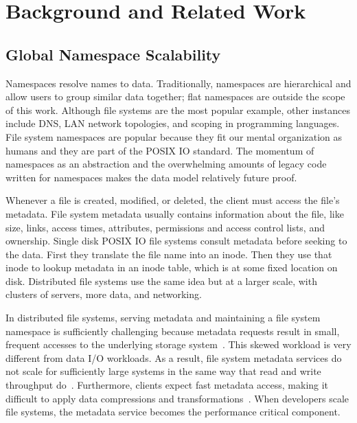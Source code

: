 \chapter{Background and Related Work}
\label{related-work}

\section{Global Namespace Scalability}

Namespaces resolve names to data. Traditionally, namespaces are hierarchical
and allow users to group similar data together; flat namespaces are outside the
scope of this work. Although file systems are the most popular example, other
instances include DNS, LAN network topologies, and scoping in programming
languages.  File system namespaces are popular because they fit our mental
organization as humans and they are part of the POSIX IO standard. The momentum
of namespaces as an abstraction and the overwhelming amounts of legacy code
written for namespaces makes the data model relatively future proof.

Whenever a file is created, modified, or deleted, the client must access the
file's metadata. File system metadata usually contains information about the
file, like size, links, access times, attributes, permissions and access
control lists, and ownership.  Single disk POSIX IO file systems consult
metadata before seeking to the data.  First they translate the file name into
an inode. Then they use that inode to lookup metadata in an inode table, which
is at some fixed location on disk.  Distributed file systems use the same idea
but at a larger scale, with clusters of servers, more data, and networking.

In distributed file systems, serving metadata and maintaining a file system
namespace is sufficiently challenging because metadata requests result in
small, frequent accesses to the underlying storage
system~\cite{roselli:atec2000-FS-workloads}.  This skewed workload is very
different from data I/O workloads. As a result, file system metadata services
do not scale for sufficiently large systems in the same way that read and write
throughput do~\cite{abad:techreport2012-fstrace, abad:ucc2012-mimesis,
alam:pdsw2011-metadata-scaling, weil:osdi2006-ceph}.  Furthermore, clients
expect fast metadata access, making it difficult to apply data compressions and
transformations~\cite{leung:atc2008-nfs-trace}. When developers scale file
systems, the metadata service becomes the performance critical component. 

